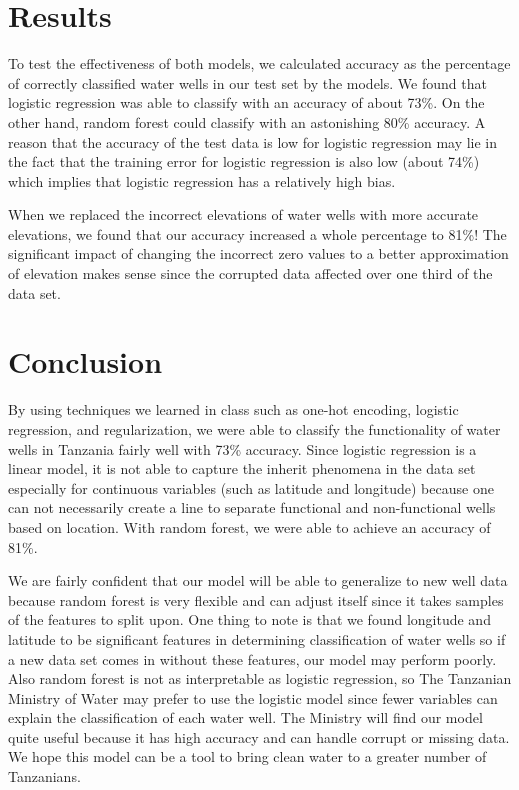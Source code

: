 \documentclass[10pt]{SelfArx} %
\begin{document}
\section{Results}

To test the effectiveness of both models, we calculated accuracy as the percentage of correctly classified water wells in our test set by the models. We found that logistic regression was able to classify with an accuracy of about 73\%. On the other hand, random forest could classify with an astonishing 80\% accuracy. A reason that the accuracy of the test data is low for logistic regression may lie in the fact that the training error for logistic regression is also low (about 74\%) which implies that logistic regression has a relatively high bias.
\break

When we replaced the incorrect elevations of water wells with more accurate elevations, we found that our accuracy increased a whole percentage to 81\%! The significant impact of changing the incorrect zero values to a better approximation of elevation makes sense since the corrupted data affected over one third of the data set.

\section{Conclusion}

By using techniques we learned in class such as one-hot encoding, logistic regression, and regularization, we were able to classify the functionality of water wells in Tanzania fairly well with 73\% accuracy. Since logistic regression is a linear model, it is not able to capture the inherit phenomena in the data set especially for continuous variables (such as latitude and longitude) because one can not necessarily create a line to separate functional and non-functional wells based on location. With random forest, we were able to achieve an accuracy of 81\%. 
\break

We are fairly confident that our model will be able to generalize to new well data because random forest is very flexible and can adjust itself since it takes samples of the features to split upon. One thing to note is that we found longitude and latitude to be significant features in determining classification of water wells so if a new data set comes in without these features, our model may perform poorly. Also random forest is not as interpretable as logistic regression, so The Tanzanian Ministry of Water may prefer to use the logistic model since fewer variables can explain the classification of each water well. The Ministry will find our model quite useful because it has high accuracy and can handle corrupt or missing data. We hope this model can be a tool to bring clean water to a greater number of Tanzanians. 
\end{document}
